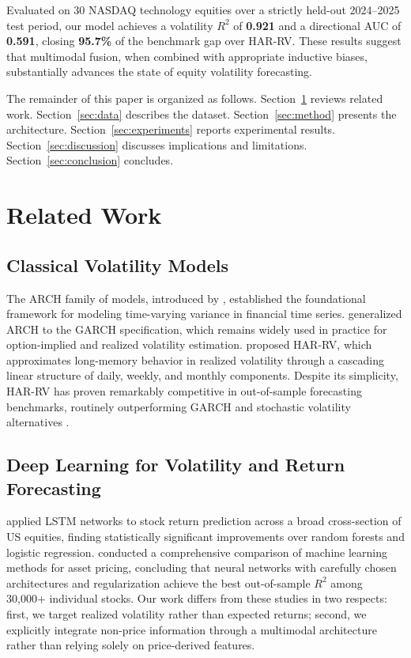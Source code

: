 \documentclass[12pt, a4paper]{article}
\begin{document}
Evaluated on 30 NASDAQ technology equities over a strictly held-out 2024--2025 test period, our model achieves a volatility $R^2$ of \textbf{0.921} and a directional AUC of \textbf{0.591}, closing \textbf{95.7\%} of the benchmark gap over HAR-RV. These results suggest that multimodal fusion, when combined with appropriate inductive biases, substantially advances the state of equity volatility forecasting.

The remainder of this paper is organized as follows. Section~\ref{sec:related} reviews related work. Section~\ref{sec:data} describes the dataset. Section~\ref{sec:method} presents the architecture. Section~\ref{sec:experiments} reports experimental results. Section~\ref{sec:discussion} discusses implications and limitations. Section~\ref{sec:conclusion} concludes.


\section{Related Work}
\label{sec:related}

\subsection{Classical Volatility Models}
The ARCH family of models, introduced by \citet{engle1982autoregressive}, established the foundational framework for modeling time-varying variance in financial time series. \citet{bollerslev1986generalized} generalized ARCH to the GARCH specification, which remains widely used in practice for option-implied and realized volatility estimation. \citet{corsi2009simple} proposed HAR-RV, which approximates long-memory behavior in realized volatility through a cascading linear structure of daily, weekly, and monthly components. Despite its simplicity, HAR-RV has proven remarkably competitive in out-of-sample forecasting benchmarks, routinely outperforming GARCH and stochastic volatility alternatives \citep{patton2011volatility}.

\subsection{Deep Learning for Volatility and Return Forecasting}
\citet{fischer2018deep} applied LSTM networks to stock return prediction across a broad cross-section of US equities, finding statistically significant improvements over random forests and logistic regression. \citet{gu2020empirical} conducted a comprehensive comparison of machine learning methods for asset pricing, concluding that neural networks with carefully chosen architectures and regularization achieve the best out-of-sample $R^2$ among 30,000+ individual stocks. Our work differs from these studies in two respects: first, we target realized volatility rather than expected returns; second, we explicitly integrate non-price information through a multimodal architecture rather than relying solely on price-derived features.
\end{document}

